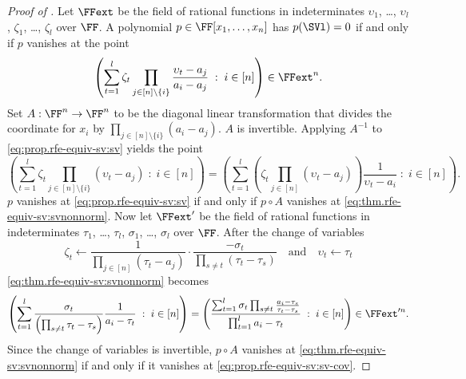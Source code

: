 \documentclass{toc}
\begin{document}
\begin{proof}[Proof of ]
  Let \(\FFext\) be the field of rational functions in indeterminates
  \(\upsilon_1\), \ldots, \(\upsilon_l\), \(\zeta_1\), \ldots, \(\zeta_l\)
  over \(\FF\).
  A polynomial \(p\in\FF[x_1,\ldots,x_n]\) has \(p(\SVl)=0\)
  if and only if
  \(p\) vanishes at the point
  \begin{equation}
    \label{eq:prop.rfe-equiv-sv:sv}
    \left(
      \sum_{t=1}^l \zeta_t \prod_{j\in [n]\setminus\{i\}} \frac{\upsilon_t -
      a_{j}}{a_i - a_{j}}
      \;:\; i \in [n]
    \right) \in \FFext^n.
  \end{equation}
  Set \(A : \FF^n \to \FF^n\) to be the diagonal linear transformation
  that divides the coordinate for \(x_i\) by
  \(\prod_{j\in [n]\setminus\{i\}} (a_i - a_{j})\).
  $A$ is invertible.
  Applying \(A^{-1}\) to \eqref{eq:prop.rfe-equiv-sv:sv} yields the point
  \begin{equation}
    \label{eq:thm.rfe-equiv-sv:svnonnorm}
    \left(
      \sum_{t=1}^l
        \zeta_t
        \prod_{j\in [n]\setminus\{i\}}
          (\upsilon_t - a_{j})
      \;:\; i \in [n]
    \right)
    =
    \left(
      \sum_{t=1}^l
        \left(
          \zeta_t
          \prod_{j\in [n]} (\upsilon_t - a_{j})
        \right)
      \frac{1}{\upsilon_t - a_i}
      \;:\; i \in [n]
    \right).
  \end{equation}
  \(p\) vanishes at \eqref{eq:prop.rfe-equiv-sv:sv} if and only if
  \(p\circ A\) vanishes at \eqref{eq:thm.rfe-equiv-sv:svnonnorm}.
  Now let \(\FFext'\) be the field of rational functions in indeterminates
  \(\tau_1\), \ldots, \(\tau_l\), \(\sigma_1\), \ldots,
  \(\sigma_l\) over \(\FF\).
  After the change of variables
  \begin{equation*}
    \zeta_t \gets
      \frac{1}{\prod_{j\in [n]}(\tau_t-a_{j})}
      \cdot
      \frac{-\sigma_t}{\prod_{s \ne t}(\tau_t - \tau_{s})}
      \quad
      \text{and}
      \quad
    \upsilon_t \gets \tau_t
  \end{equation*}
  \eqref{eq:thm.rfe-equiv-sv:svnonnorm} becomes
  \begin{equation}
    \label{eq:prop.rfe-equiv-sv:sv-cov}
    \left(
      \sum_{t=1}^l
        \frac{\sigma_t}{\left(\prod_{s \ne t} \tau_t - \tau_{s}\right)}
        \frac{1}{a_i - \tau_t}
      \;:\; i \in [n]
    \right)
    =
    \left(
      \frac{
        \sum_{t=1}^l
          \sigma_t
          \prod_{s \ne t} \frac{a_i - \tau_{s}}%
                               {\tau_t - \tau_{s}}
      }{
        \prod_{t=1}^l a_i - \tau_t
      }
      \;:\; i \in [n]
    \right)
    \in \FFext'^n.
  \end{equation}
  Since the change of variables is invertible,
  \(p\circ A\) vanishes at \eqref{eq:thm.rfe-equiv-sv:svnonnorm}
  if and only if it vanishes at \eqref{eq:prop.rfe-equiv-sv:sv-cov}.


\end{proof}
\end{document}
